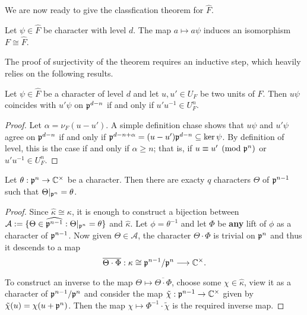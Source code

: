We are now ready to give the classfication theorem for $\hat{F}$.

\begin{thm}\label{add_dual}
    Let $\psi\in\hat{F}$ be character with level $d$. The map $a\mapsto a\psi$ induces an isomorphism $F\cong\hat{F}$. 
\end{thm}

The proof of surjectivity of the theorem requires an inductive step, which heavily relies on the following results.

\begin{lemma}\label{lem_congruence}
    Let $\psi\in\hat{F}$ be a character of level $d$ and let $u,u'\in U_F$ be two units of $F$. Then $u\psi$ coincides with $u'\psi$ on $\mathfrak{p}^{d-n}$ if and only if $u'u^{-1}\in U_F^{n}$.
\end{lemma}
\begin{proof}
    Let $\alpha=\nu_F(u-u')$. A simple definition chase shows that $u\psi$ and $u'\psi$ agree on $\mathfrak{p}^{d-n}$ if and only if $\mathfrak{p}^{d-n+\alpha}=(u-u')\mathfrak{p}^{d-n}\subseteq\ker\psi$. By definition of level, this is the case if and only if $\alpha\geq n$; that is, if $u\equiv u'\pmod{\mathfrak{p}^n}$ or $u'u^{-1}\in U_F^{n}$.
\end{proof}

\begin{lemma}\label{lem_chars}
    Let $\theta:\mathfrak{p}^{n}\rightarrow\mathbb{C}^{\times}$ be a character. Then there are exacty $q$ characters $\Theta$ of $\mathfrak{p}^{n-1}$ such that $\Theta|_{\mathfrak{p}^n}=\theta$.
\end{lemma}

\begin{proof}
    Since $\hat\kappa\cong\kappa$, it is enough to construct a bijection between $\mathcal{A}:=\{\Theta\in\widehat{\mathfrak{p}^{n-1}}:\Theta|_{\mathfrak{p}^n}=\theta\}$ and $\hat{\kappa}$. Let $\phi=\theta^{-1}$ and let $\Phi$ be \textbf{any} lift of $\phi$ as a character of $\mathfrak{p}^{n-1}$. Now given $\Theta\in\mathcal{A}$, the character $\Theta\cdot\Phi$ is trivial on $\mathfrak{p}^{n}$ and thus it descends to a map 
    $$\overline{\Theta\cdot\Phi}:\kappa\cong\mathfrak{p}^{n-1}/\mathfrak{p}^n\longrightarrow\mathbb{C}^{\times}.$$

    To construct an inverse to the map $\Theta\mapsto\overline{\Theta\cdot\Phi}$, choose some $\chi\in\hat\kappa$, view it as a character of $\mathfrak{p}^{n-1}/\mathfrak{p}^{n}$ and consider the map $\tilde\chi:\mathfrak{p}^{n-1}\rightarrow\mathbb{C}^{\times}$ given by $\tilde{\chi}(u)=\chi(u+\mathfrak{p}^n)$. Then the map $\chi\mapsto\Phi^{-1}\cdot\tilde\chi$ is the required inverse map.
\end{proof}

